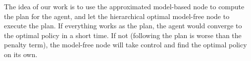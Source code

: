 The idea of our work is to use the approximated model-based node to 
compute the plan for the agent, and let the hierarchical optimal model-free node
to execute the plan. If everything works as the plan, the agent would converge to the optimal
policy in a short time. If not (following the plan is worse than the penalty term),
the model-free node will take control and find the optimal policy on its own.







